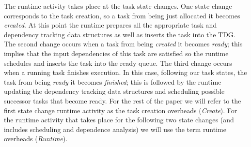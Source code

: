 The runtime activity takes place at the task state changes. 
One state change corresponds to the task creation, so a task from being just allocated it becomes \textit{created}. 
At this point the runtime prepares all the appropriate task and dependency tracking data structures as well as inserts the task into the TDG.
The second change occurs when a task from being \textit{created} it becomes \textit{ready};
this implies that the input dependencies of this task are satisfied so the runtime schedules and inserts the task into the ready queue.
The third change occurs when a running task finishes execution. 
In this case, following our task states, the task from being \textit{ready} it becomes \textit{finished}; this is followed by the runtime updating the dependency tracking data structures and scheduling possible successor tasks that become ready. 
For the rest of the paper we will refer to the first state change runtime activity as the task creation overheads (\textit{Create}).
For the runtime activity that takes place for the following two state changes (and includes scheduling and dependence analysis) we will use the term runtime overheads (\textit{Runtime}).



%
%
%
%


